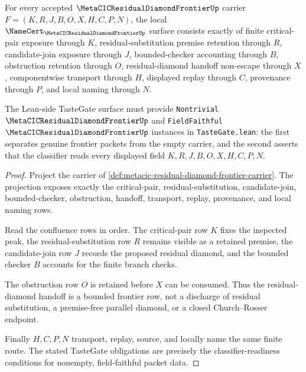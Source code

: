 \begin{theorem}
\label{thm:metacic-residual-diamond-frontier-obligations}
For every accepted $\MetaCICResidualDiamondFrontierUp$ carrier $F=(K,R,J,B,O,X,H,C,P,N)$, the local $\NameCert_{\MetaCICResidualDiamondFrontierUp}$ surface consists exactly of finite critical-pair exposure through $K$, residual-substitution premise retention through $R$, candidate-join exposure through $J$, bounded-checker accounting through $B$, obstruction retention through $O$, residual-diamond handoff non-escape through $X$, componentwise transport through $H$, displayed replay through $C$, provenance through $P$, and local naming through $N$.

The Lean-side TasteGate surface must provide \texttt{Nontrivial} $\MetaCICResidualDiamondFrontierUp$ and \texttt{FieldFaithful} $\MetaCICResidualDiamondFrontierUp$ instances in \texttt{TasteGate.lean}: the first separates genuine frontier packets from the empty carrier, and the second asserts that the classifier reads every displayed field $K,R,J,B,O,X,H,C,P,N$.
\end{theorem}
\begin{proof}
Project the carrier of \autoref{def:metacic-residual-diamond-frontier-carrier}. The projection exposes exactly the critical-pair, residual-substitution, candidate-join, bounded-checker, obstruction, handoff, transport, replay, provenance, and local naming rows.

Read the confluence rows in order. The critical-pair row $K$ fixes the inspected peak, the residual-substitution row $R$ remains visible as a retained premise, the candidate-join row $J$ records the proposed residual diamond, and the bounded checker $B$ accounts for the finite branch checks.

The obstruction row $O$ is retained before $X$ can be consumed. Thus the residual-diamond handoff is a bounded frontier row, not a discharge of residual substitution, a premise-free parallel diamond, or a closed Church--Rosser endpoint.

Finally $H,C,P,N$ transport, replay, source, and locally name the same finite route. The stated TasteGate obligations are precisely the classifier-readiness conditions for nonempty, field-faithful packet data.
\end{proof}

